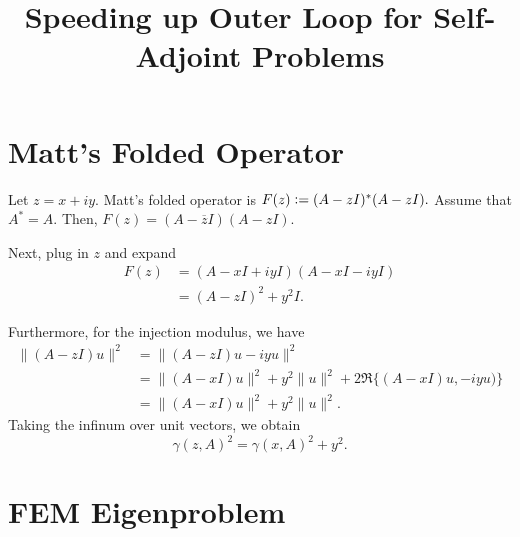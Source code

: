 \documentclass[12pt,a4paper]{article}
\title{Speeding up Outer Loop for Self-Adjoint Problems}
\author{}
\date{}
\newcommand{\defeq}{\vcentcolon=}
\theoremstyle{boldthm}
\theoremstyle{bolddefn}
\begin{document}
\maketitle

\section{Matt's Folded Operator}

Let $z = x + iy.$ Matt's folded operator is $F(z) \defeq (A-zI)^*(A-zI).$ Assume that $A^*=A.$ Then,
$F(z) = (A-\overline{z}I)(A-zI).$

Next, plug in $z$ and expand
\begin{align}
    F(z) &= (A-xI + iyI)(A-xI-iyI)\\
    &=(A-zI)^2 + y^2 I.
\end{align}

Furthermore, for the injection modulus, we have
\begin{align}
    \|(A-zI) u \|^2 &= \| (A-zI) u - iyu \|^2 \\
    &= \| (A-xI)u \|^2 + y^2 \|u\|^2 + 2 \Re\{ (A-xI)u, -iyu ) \} \\
    &= \| (A-xI)u \|^2 + y^2 \|u\|^2.
\end{align}
Taking the infinum over unit vectors, we obtain
\begin{equation}
    \gamma(z, A)^2 = \gamma(x, A)^2 + y^2. 
\end{equation}

\section{FEM Eigenproblem}
\end{document}
